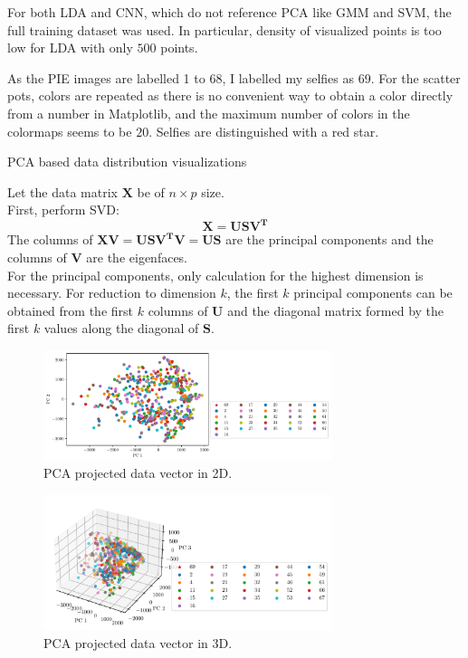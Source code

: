 \documentclass[a4paper]{exam}
\begin{document}
For both LDA and CNN, which do not reference PCA like GMM and SVM, the full training dataset was used.
In particular, density of visualized points is too low for LDA with only $500$ points.

As the PIE images are labelled 1 to 68, I labelled my selfies as 69.
For the scatter pots, colors are repeated as there is no convenient way to obtain a color directly from a number in Matplotlib,
and the maximum number of colors in the colormaps seems to be $20$. Selfies are distinguished with a red star.

\begin{questions}
    \question PCA based data distribution visualizations

    Let the data matrix $\mathbf{X}$ be of $n \times p$ size.\\
    First, perform SVD:
    \begin{equation}
        \mathbf{X}=\mathbf{USV^T}
    \end{equation}
    The columns of $\mathbf{XV}=\mathbf{USV^TV}=\mathbf{US}$ are the principal components and the columns of $\mathbf{V}$ are the eigenfaces.\\
    For the principal components, only calculation for the highest dimension is necessary. For reduction to
    dimension $k$, the first $k$ principal components can be obtained from the first $k$ columns of
    $\mathbf{U}$ and the diagonal matrix formed by the first $k$ values along the diagonal of $\mathbf{S}$.

    \begin{figure}[h]
        \centering
        \includegraphics[width=0.75\textwidth]{pca_2d}
        \caption{PCA projected data vector in 2D.}
        \label{fig:pca_2d}
    \end{figure}

    \begin{figure}[ht]
        \centering
        \includegraphics[width=0.75\textwidth]{pca_3d}
        \caption{PCA projected data vector in 3D.}
        \label{fig:pca_3d}
    \end{figure}


\end{questions}
\end{document}
